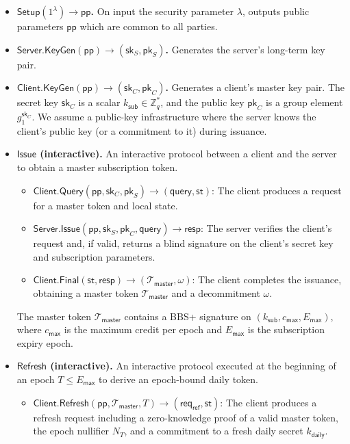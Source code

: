 \documentclass[11pt]{article}
\theoremstyle{definitionstyle}
\theoremstyle{plain}
\begin{document}
\begin{itemize}[leftmargin=*]
\item \textbf{$\mathsf{Setup}(1^\lambda) \to \mathsf{pp}$.} On input the security parameter $\lambda$, outputs public parameters $\mathsf{pp}$ which are common to all parties.
\item \textbf{$\mathsf{Server.KeyGen}(\mathsf{pp}) \to (\mathsf{sk}_S, \mathsf{pk}_S)$.} Generates the server's long-term key pair.
\item \textbf{$\mathsf{Client.KeyGen}(\mathsf{pp}) \to (\mathsf{sk}_C, \mathsf{pk}_C)$.} Generates a client's master key pair. The secret key $\mathsf{sk}_C$ is a scalar $k_{\mathsf{sub}} \in \mathbb{Z}_q^*$, and the public key $\mathsf{pk}_C$ is a group element $g_1^{\mathsf{sk}_C}$. We assume a public-key infrastructure where the server knows the client's public key (or a commitment to it) during issuance.
\item \textbf{$\mathsf{Issue}$ (interactive).} An interactive protocol between a client and the server to obtain a master subscription token.
  \begin{itemize}
  \item $\mathsf{Client.Query}(\mathsf{pp}, \mathsf{sk}_C, \mathsf{pk}_S) \to (\mathsf{query}, \mathsf{st})$: The client produces a request for a master token and local state.
  \item $\mathsf{Server.Issue}(\mathsf{pp}, \mathsf{sk}_S, \mathsf{pk}_C, \mathsf{query}) \to \mathsf{resp}$: The server verifies the client's request and, if valid, returns a blind signature on the client's secret key and subscription parameters.
  \item $\mathsf{Client.Final}(\mathsf{st}, \mathsf{resp}) \to (\mathcal{T}_{\mathsf{master}}, \omega)$: The client completes the issuance, obtaining a master token $\mathcal{T}_{\mathsf{master}}$ and a decommitment $\omega$.
  \end{itemize}
  The master token $\mathcal{T}_{\mathsf{master}}$ contains a BBS+ signature on $(k_{\mathsf{sub}}, c_{\mathsf{max}}, E_{\mathsf{max}})$, where $c_{\mathsf{max}}$ is the maximum credit per epoch and $E_{\mathsf{max}}$ is the subscription expiry epoch.
\item \textbf{$\mathsf{Refresh}$ (interactive).} An interactive protocol executed at the beginning of an epoch $T \le E_{\mathsf{max}}$ to derive an epoch-bound daily token.
  \begin{itemize}
  \item $\mathsf{Client.Refresh}(\mathsf{pp}, \mathcal{T}_{\mathsf{master}}, T) \to (\mathsf{req}_{\mathsf{ref}}, \mathsf{st})$: The client produces a refresh request including a zero-knowledge proof of a valid master token, the epoch nullifier $N_T$, and a commitment to a fresh daily secret $k_{\mathsf{daily}}$.

\end{itemize}
\end{itemize}
\end{document}
